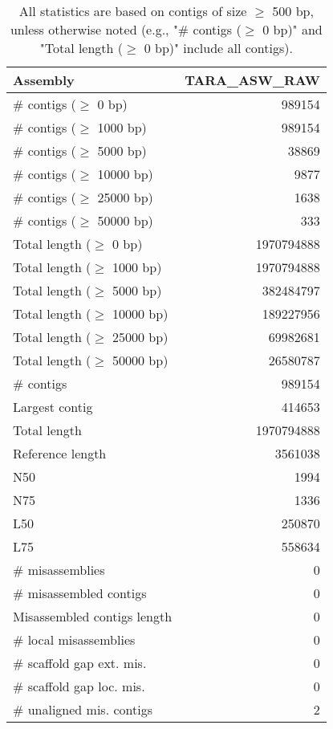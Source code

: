 \documentclass[12pt,a4paper]{article}
\begin{document}
\begin{table}[ht]
\begin{center}
\caption{All statistics are based on contigs of size $\geq$ 500 bp, unless otherwise noted (e.g., "\# contigs ($\geq$ 0 bp)" and "Total length ($\geq$ 0 bp)" include all contigs).}
\begin{tabular}{|l*{1}{|r}|}
\hline
Assembly & TARA\_ASW\_RAW \\ \hline
\# contigs ($\geq$ 0 bp) & 989154 \\ \hline
\# contigs ($\geq$ 1000 bp) & 989154 \\ \hline
\# contigs ($\geq$ 5000 bp) & 38869 \\ \hline
\# contigs ($\geq$ 10000 bp) & 9877 \\ \hline
\# contigs ($\geq$ 25000 bp) & 1638 \\ \hline
\# contigs ($\geq$ 50000 bp) & 333 \\ \hline
Total length ($\geq$ 0 bp) & 1970794888 \\ \hline
Total length ($\geq$ 1000 bp) & 1970794888 \\ \hline
Total length ($\geq$ 5000 bp) & 382484797 \\ \hline
Total length ($\geq$ 10000 bp) & 189227956 \\ \hline
Total length ($\geq$ 25000 bp) & 69982681 \\ \hline
Total length ($\geq$ 50000 bp) & 26580787 \\ \hline
\# contigs & 989154 \\ \hline
Largest contig & 414653 \\ \hline
Total length & 1970794888 \\ \hline
Reference length & 3561038 \\ \hline
N50 & 1994 \\ \hline
N75 & 1336 \\ \hline
L50 & 250870 \\ \hline
L75 & 558634 \\ \hline
\# misassemblies & 0 \\ \hline
\# misassembled contigs & 0 \\ \hline
Misassembled contigs length & 0 \\ \hline
\# local misassemblies & 0 \\ \hline
\# scaffold gap ext. mis. & 0 \\ \hline
\# scaffold gap loc. mis. & 0 \\ \hline
\# unaligned mis. contigs & 2 \\ \hline

\end{tabular}
\end{center}
\end{table}
\end{document}
